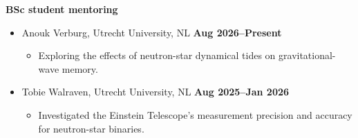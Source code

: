 \textbf{BSc student mentoring}
%
\vspace*{0.05in}
\begin{itemize}
    \item[] Anouk Verburg, Utrecht University, NL
    \hfill \textbf{Aug 2026--Present}
    \begin{itemize}[nosep]
        \item[] Exploring the effects of neutron-star dynamical tides on
        gravitational-wave memory.
    \end{itemize}
    \item[] Tobie Walraven, Utrecht University, NL
    \hfill \textbf{Aug 2025--Jan 2026}
    \begin{itemize}[nosep]
        \item[] Investigated the Einstein Telescope's measurement precision and
        accuracy for neutron-star binaries.
    \end{itemize}
\end{itemize}
